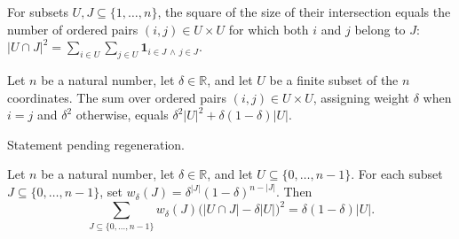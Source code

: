 \begin{theorem}
\label{FABL.sq_card_inter_eq_sum_pairIndicator}
\leanok
{}
For subsets $U,J\subseteq\{1,\ldots,n\}$, the square of the size of their intersection
equals the number of ordered pairs $(i,j)\in U\times U$ for which both $i$ and $j$
belong to $J$: $|U\cap J|^2=\sum_{i\in U}\sum_{j\in U}\mathbf{1}_{i\in J\,\wedge\,j\in
J}$.
\end{theorem}

\begin{theorem}
\label{FABL.sum_pairDiagonalWeight}
\leanok
{}
Let $n$ be a natural number, let $\delta\in\mathbb R$, and let $U$ be a finite subset of
the $n$ coordinates. The sum over ordered pairs $(i,j)\in U\times U$, assigning weight
$\delta$ when $i=j$ and $\delta^2$ otherwise, equals
$\delta^2|U|^2+\delta(1-\delta)|U|$.
\end{theorem}

\begin{theorem}
\label{FABL.sum_deltaRandomSubsetWeight_mul_sq_card_inter}
\leanok
{}
Statement pending regeneration.
\end{theorem}

\begin{theorem}
\label{FABL.sum_deltaRandomSubsetWeight_mul_sq_card_inter_sub_mean}
\leanok
{}
Let $n$ be a natural number, let $\delta\in\mathbb{R}$, and let
$U\subseteq\{0,\ldots,n-1\}$. For each subset $J\subseteq\{0,\ldots,n-1\}$, set
$w_\delta(J)=\delta^{|J|}(1-\delta)^{n-|J|}$. Then \[\sum_{J\subseteq\{0,\ldots,n-1\}}
w_\delta(J)\bigl(|U\cap J|-\delta|U|\bigr)^2=\delta(1-\delta)|U|.\]
\end{theorem}

